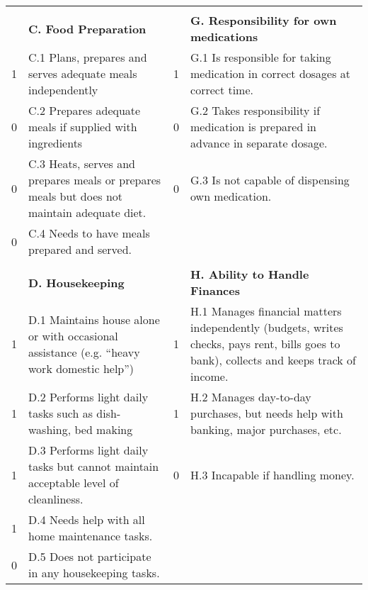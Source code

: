 \documentclass[main.tex]{subfiles}
\begin{document}
\begin{center}
\begin{longtable}{ |p{0.8cm}p{6.8cm}|p{0.8cm}p{6.8cm}|  }
 \vspace{0.15cm} & & &\\

 & \textbf{C. Food Preparation} & & \textbf{G. Responsibility for own medications}\\
 
 1 & C.1 Plans, prepares and serves adequate meals independently & 1 & G.1 Is responsible for taking medication in correct dosages at correct time.\\
 
 0 & C.2 Prepares adequate meals if supplied with ingredients & 0 & G.2 Takes responsibility if medication is prepared in advance in separate dosage.\\
 
 0 & C.3 Heats, serves and prepares meals or prepares meals but does not maintain adequate diet. & 0 & G.3 Is not capable of dispensing own medication.\\
 
 0 & C.4 Needs to have meals prepared and served. & & \\
 
 \vspace{0.15cm} & & &\\
  
 & \textbf{D. Housekeeping} & & \textbf{H. Ability to Handle Finances}\\ 
 
 1 & D.1 Maintains house alone or with occasional assistance (e.g. “heavy work domestic help”) & 1 & H.1 Manages financial matters independently (budgets, writes checks, pays rent, bills goes to bank), collects and keeps track of income.\\
 
 1 & D.2 Performs light daily tasks such as dish-washing, bed making & 1 & H.2 Manages day-to-day purchases, but needs
help with banking, major purchases, etc.\\

 1 & D.3 Performs light daily tasks but cannot maintain acceptable level of cleanliness. & 0 & H.3 Incapable if handling money.\\
 
 1 & D.4 Needs help with all home maintenance tasks. & & \\
 0 & D.5 Does not participate in any housekeeping tasks. & &\\
  
 \hline
\end{longtable}
\label{tab:IADL}

\end{center}
\end{document}
